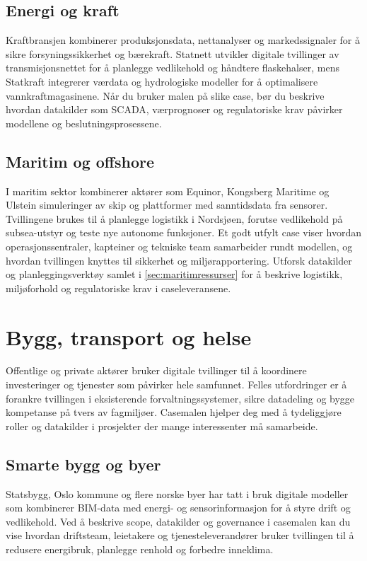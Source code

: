 \subsection*{Energi og kraft}
Kraftbransjen kombinerer produksjonsdata, nettanalyser og markedssignaler for å sikre forsyningssikkerhet og bærekraft. Statnett utvikler digitale tvillinger av transmisjonsnettet for å planlegge vedlikehold og håndtere flaskehalser, mens Statkraft integrerer værdata og hydrologiske modeller for å optimalisere vannkraftmagasinene. Når du bruker malen på slike case, bør du beskrive hvordan datakilder som SCADA, værprognoser og regulatoriske krav påvirker modellene og beslutningsprosessene.

\subsection*{Maritim og offshore}
I maritim sektor kombinerer aktører som Equinor, Kongsberg Maritime og Ulstein simuleringer av skip og plattformer med sanntidsdata fra sensorer. Tvillingene brukes til å planlegge logistikk i Nordsjøen, forutse vedlikehold på subsea-utstyr og teste nye autonome funksjoner. Et godt utfylt case viser hvordan operasjonssentraler, kapteiner og tekniske team samarbeider rundt modellen, og hvordan tvillingen knyttes til sikkerhet og miljørapportering. Utforsk datakilder og planleggingsverktøy samlet i \autoref{sec:maritimressurser} for å beskrive logistikk, miljøforhold og regulatoriske krav i caseleveransene.

\section{Bygg, transport og helse}
Offentlige og private aktører bruker digitale tvillinger til å koordinere investeringer og tjenester som påvirker hele samfunnet. Felles utfordringer er å forankre tvillingen i eksisterende forvaltningssystemer, sikre datadeling og bygge kompetanse på tvers av fagmiljøer. Casemalen hjelper deg med å tydeliggjøre roller og datakilder i prosjekter der mange interessenter må samarbeide.

\subsection*{Smarte bygg og byer}
Statsbygg, Oslo kommune og flere norske byer har tatt i bruk digitale modeller som kombinerer BIM-data med energi- og sensorinformasjon for å styre drift og vedlikehold. Ved å beskrive scope, datakilder og governance i casemalen kan du vise hvordan driftsteam, leietakere og tjenesteleverandører bruker tvillingen til å redusere energibruk, planlegge renhold og forbedre inneklima.

